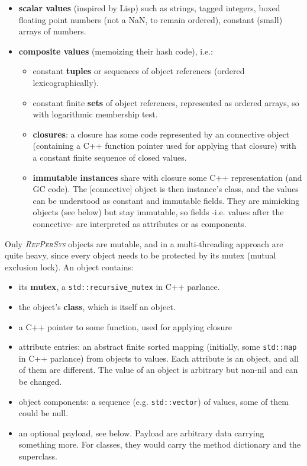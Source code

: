 \documentclass{IEEEtran}
\newcommand{\RefPerSys}{{\textit{\textsc{RefPerSys}}}}
\begin{document}
\begin{itemize}
\item \textbf{scalar values} (inspired by Lisp) such as strings,
  tagged integers, boxed floating point numbers (not a NaN, to remain
  ordered), constant (small) arrays of numbers.
\item \textbf{composite values} (memoizing their hash code), i.e.:
  \begin{itemize}
  \item constant \textbf{tuples} or sequences of object references (ordered
    lexicographically).
  \item constant finite \textbf{sets} of object references, represented as
    ordered arrays, so with logarithmic membership test.
  \item \textbf{closures}: a closure has some code represented by an
    connective object (containing a C++ function pointer used for
    applying that closure) with a constant finite sequence of closed
    values.
  \item \textbf{immutable instances} share with closure some C++
    representation (and GC code). The [connective] object is then
    instance's class, and the values can be understood as constant and
    immutable fields. They are mimicking objects (see below) but stay
    immutable, so fields -i.e. values after the connective- are
    interpreted as attributes or as components.
  \end{itemize}
\end{itemize}

Only {\RefPerSys} objects are mutable, and in a multi-threading
approach are quite heavy, since every object needs to be protected by
its mutex (mutual exclusion lock). An object contains:


\begin{itemize}
\item its \textbf{mutex}, a \texttt{std::recursive\_mutex} in C++ parlance.
\item the object's \textbf{class}, which is itself an object.
\item a C++ pointer to some function, used for applying closure
  \item attribute entries: an abstract finite sorted mapping
    (initially, some \texttt{std::map} in C++ parlance) from objects
    to values. Each attribute is an object, and all of them are
    different. The value of an object is arbitrary but non-nil and can
    be changed.
  \item object components: a sequence (e.g. \texttt{std::vector}) of
      values, some of them could be null.
    \item an optional payload, see below. Payload are arbitrary data
      carrying something more. For classes, they would carry the
      method dictionary and the superclass.
\end{itemize}
\end{document}
